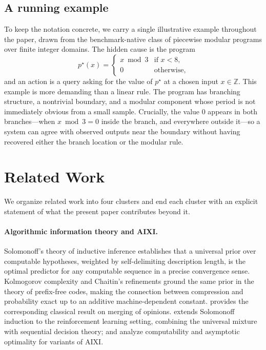 \documentclass[11pt]{article}
\theoremstyle{remark}
\begin{document}
\subsection{A running example}

To keep the notation concrete, we carry a single illustrative example throughout the paper, drawn from the benchmark-native class of piecewise modular programs over finite integer domains. The hidden cause is the program
\[
p^\star(x) =
\begin{cases}
x \bmod 3 & \text{if } x < 8, \\
0 & \text{otherwise,}
\end{cases}
\]
and an action is a query asking for the value of \(p^\star\) at a chosen input \(x \in \mathbb{Z}\). This example is more demanding than a linear rule. The program has branching structure, a nontrivial boundary, and a modular component whose period is not immediately obvious from a small sample. Crucially, the value \(0\) appears in both branches---when \(x \bmod 3 = 0\) inside the branch, and everywhere outside it---so a system can agree with observed outputs near the boundary without having recovered either the branch location or the modular rule.

\section{Related Work}
\label{sec:related}

We organize related work into four clusters and end each cluster with an explicit statement of what the present paper contributes beyond it.

\paragraph{Algorithmic information theory and AIXI.}

Solomonoff's theory of inductive inference \citep{Solomonoff1964a,Solomonoff1964b,Solomonoff1978} establishes that a universal prior over computable hypotheses, weighted by self-delimiting description length, is the optimal predictor for any computable sequence in a precise convergence sense. Kolmogorov complexity \citep{Kolmogorov1965} and Chaitin's refinements \citep{Chaitin1975} ground the same prior in the theory of prefix-free codes, making the connection between compression and probability exact up to an additive machine-dependent constant. \citet{BlackwellDubins1962} provides the corresponding classical result on merging of opinions. \citet{Hutter2005} extends Solomonoff induction to the reinforcement learning setting, combining the universal mixture with sequential decision theory; \citet{LeikeHutter2015,LeikeEtAl2016} and \citet{Leike2016} analyze computability and asymptotic optimality for variants of AIXI.
\end{document}
